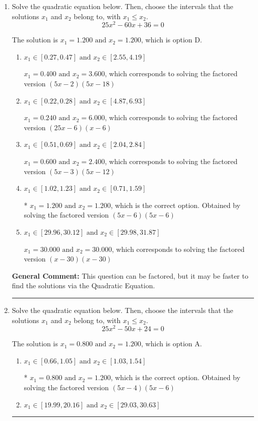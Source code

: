 \documentclass{extbook}[14pt]
\newcommand{\litem}[1]{\item #1

\rule{\textwidth}{0.4pt}}
\begin{document}
\begin{enumerate}\litem{
Solve the quadratic equation below. Then, choose the intervals that the solutions $x_1$ and $x_2$ belong to, with $x_1 \leq x_2$.
\[ 25x^{2} -60 x + 36 = 0 \]

The solution is \( x_1 = 1.200 \text{ and } x_2 = 1.200 \), which is option D.\begin{enumerate}[label=\Alph*.]
\item \( x_1 \in [0.27, 0.47] \text{ and } x_2 \in [2.55, 4.19] \)

$x_1 = 0.400 \text{ and } x_2 = 3.600$, which corresponds to solving the factored version $(5x -2)(5x -18)$
\item \( x_1 \in [0.22, 0.28] \text{ and } x_2 \in [4.87, 6.93] \)

$x_1 = 0.240 \text{ and } x_2 = 6.000$, which corresponds to solving the factored version $(25x -6)(x -6)$
\item \( x_1 \in [0.51, 0.69] \text{ and } x_2 \in [2.04, 2.84] \)

$x_1 = 0.600 \text{ and } x_2 = 2.400$, which corresponds to solving the factored version $(5x -3)(5x -12)$
\item \( x_1 \in [1.02, 1.23] \text{ and } x_2 \in [0.71, 1.59] \)

* $x_1 = 1.200 \text{ and } x_2 = 1.200$, which is the correct option. Obtained by solving the factored version $(5x -6)(5x -6)$
\item \( x_1 \in [29.96, 30.12] \text{ and } x_2 \in [29.98, 31.87] \)

$x_1 = 30.000 \text{ and } x_2 = 30.000$, which corresponds to solving the factored version $(x -30)(x -30)$
\end{enumerate}

\textbf{General Comment:} This question can be factored, but it may be faster to find the solutions via the Quadratic Equation.
}
\litem{
Solve the quadratic equation below. Then, choose the intervals that the solutions $x_1$ and $x_2$ belong to, with $x_1 \leq x_2$.
\[ 25x^{2} -50 x + 24 = 0 \]

The solution is \( x_1 = 0.800 \text{ and } x_2 = 1.200 \), which is option A.\begin{enumerate}[label=\Alph*.]
\item \( x_1 \in [0.66, 1.05] \text{ and } x_2 \in [1.03, 1.54] \)

* $x_1 = 0.800 \text{ and } x_2 = 1.200$, which is the correct option. Obtained by solving the factored version $(5x -4)(5x -6)$
\item \( x_1 \in [19.99, 20.16] \text{ and } x_2 \in [29.03, 30.63] \)


\end{enumerate}}
\end{enumerate}
\end{document}
